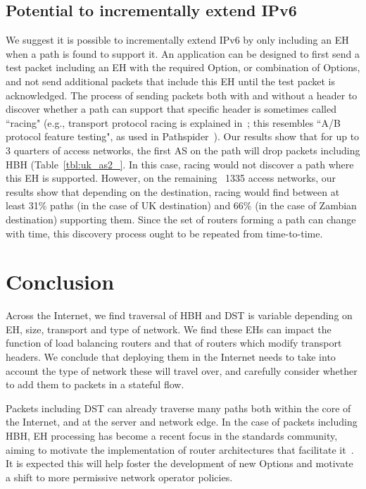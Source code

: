 \documentclass[conference]{IEEEtran}
\begin{document}
\subsection{Potential to incrementally extend IPv6}


We suggest it is possible to incrementally extend IPv6 by only including an EH when a path is found to support it. 
An application can be designed to first send a test packet including an EH with the required Option, or combination of Options, and not send additional packets that include this EH until the test packet is acknowledged. The process of sending packets both with and without a header to discover whether a path can support that specific header is sometimes called ``racing" (e.g., transport protocol racing is explained in~\cite{ietf-taps-arch-18}; this resembles ``A/B protocol feature testing", as used in Pathspider~\cite{learmonth2016pathspider}). Our results show that for up to 3 quarters of access networks, the first AS on the path will drop packets including HBH (Table~\ref{tbl:uk_as2_}. In this case, racing would not discover a path where this EH is supported. However, on the remaining ~1335 access networks, our results show that depending on the destination, racing would find between at least 31\% paths (in the case of UK destination) and 66\% (in the case of Zambian destination) supporting them.
Since the set of routers forming a path can change with time, this discovery process ought to be repeated from time-to-time. 

\section{Conclusion}
\label{sec:conclusion}

Across the Internet, we find traversal of HBH and DST is variable depending on EH, size, transport and type of network. We find these EHs can impact the function of load balancing routers and that of routers which modify transport headers. We conclude that deploying them in the Internet needs to take into account the type of network these will travel over, and carefully consider whether to add them to packets in a stateful flow.

Packets including DST can already traverse many paths both within the core of the Internet, and at the server and network edge. In the case of packets including HBH, 
EH processing has become a recent focus in the standards community, aiming to motivate the implementation of router architectures that facilitate it~\cite{ietf-6man-HBH-processing-06, ietf-v6ops-hbh-03, ietf-6man-eh-limits-02}. 
It is expected this will help foster the development of new Options and motivate a shift to more permissive network operator policies.
\end{document}
